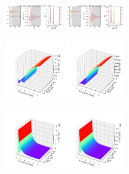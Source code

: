 \documentclass[a4paper]{article}
\begin{document}
\begin{figure}[H]
  \centering
  \includegraphics[width=0.23\textwidth]{HL-A0-v5-imp3.pdf}
  \includegraphics[width=0.23\textwidth]{HL-A0-v5-imp4.pdf}
\end{figure}
\begin{figure}[H]
  \centering
  \includegraphics[width=0.23\textwidth]{cond3d_real-A0-v5-imp3.pdf}
  \includegraphics[width=0.23\textwidth]{cond3d_real-A0-v5-imp4.pdf}
\end{figure}
\begin{figure}[H]
  \centering
  \includegraphics[width=0.23\textwidth]{cond3d_imag-A0-v5-imp3.pdf}
  \includegraphics[width=0.23\textwidth]{cond3d_imag-A0-v5-imp4.pdf}
\end{figure}
\end{document}
